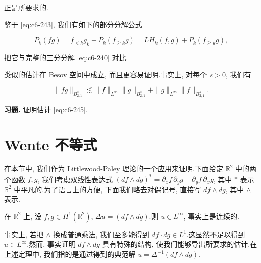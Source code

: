正是所要求的.

\begin{remark*}
鉴于 \eqref{eq:c6-243}, 我们有如下的部分分解公式

\begin{equation}
P_k(fg) = f_{< k} g_k + P_k(f_{\geq k} g) = LH_k(f, g) + P_k(f_{\geq k} g), \label{eq:c6-244}
\end{equation}

把它与完整的三分分解 \eqref{eq:c6-240} 对比.
\end{remark*}

类似的估计在 Besov 空间中成立, 而且更容易证明.事实上, 对每个 $s > 0$, 我们有

\begin{equation}
\|fg\|_{B_{2, 1}^s} \lesssim \|f\|_{L^\infty} \|g\|_{B_{2, 1}^s} + \|g\|_{L^\infty} \|f\|_{B_{2, 1}^s}.\label{eq:c6-245}
\end{equation}

\textbf{习题.} 证明估计 \eqref{eq:c6-245}.

\section{Wente 不等式}

在本节中, 我们作为 Littlewood-Paley 理论的一个应用来证明.下面给定 $\mathbb{R}^2$ 中的两个函数 $f, g$, 我们考虑双线性表达式 $(df \wedge dg)^* = \partial_x f\, \partial_y g - \partial_y f\, \partial_x g$, 其中 $*$ 表示 $\mathbb{R}^2$ 中平凡的.为了语言上的方便, 下面我们略去对偶记号, 直接写 $df \wedge dg$, 其中 $\wedge$ 表示.

\begin{theorem}\label{thm:c6-4.1}
在 $\mathbb{R}^2$ 上, 设 $f, g \in H^1(\mathbb{R}^2)$, $\Delta u = (df \wedge dg)$.则 $u \in L^\infty$, 事实上是连续的.
\end{theorem}

\begin{remark*}
事实上, 若把 $\wedge$ 换成普通乘法, 我们至多能得到 $df \cdot dg \in L^1$.这显然不足以得到 $u \in L^\infty$.然而, 事实证明 $df \wedge dg$ 具有特殊的结构, 使我们能够导出所要求的估计.在上述定理中, 我们指的是通过得到的典范解 $u = \Delta^{-1}(df \wedge dg)$.
\end{remark*}

